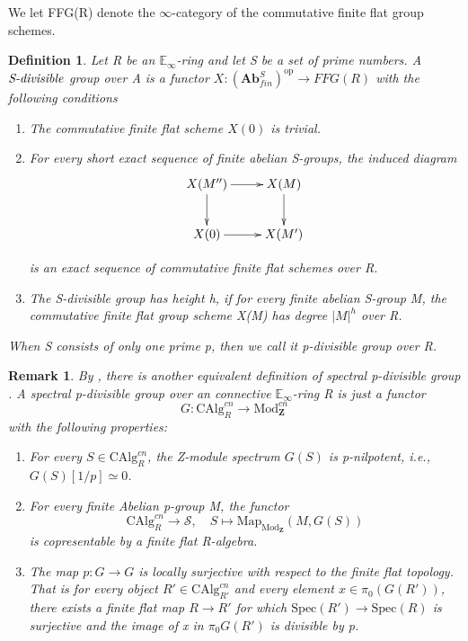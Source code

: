 \documentclass[12pt]{article}
\theoremstyle{thry}
\newtheorem{definition}[theorem]{Definition}
\newtheorem{remark}[theorem]{Remark}
\def  \Ab       {\mathbf{Ab}}
\def  \CAlg     {\mathrm{CAlg}}
\def  \Mod      {\mathrm{Mod}}
\def  \Map      {\mathrm{Map}}
\def  \op       {\mathrm{op}}
\def  \Spec     {\mathrm{Spec}}
\def  \cs       {\mathcal{S}}
\def  \be       {\mathbb{E}}
\def  \bz       {\mathbf{Z}}
\begin{document}
We let FFG(R) denote the $\infty$-category of the commutative finite flat group schemes. 

\begin{definition}
	Let R be an $\be_{\infty}$-ring and let S be a set of prime numbers. A $\emph{S-divisible}$ group over A is a functor $X: (\Ab^S_{fin})^{\op} \to FFG(R) $  with the following conditions
	\begin{enumerate}
		\item  The commutative finite flat scheme $X(0)$ is trivial.
		\item For every short exact sequence of finite abelian S-groups, the induced diagram
		$$
		\xymatrix{
			X(M'')  \ar[r]  \ar[d]  & X(M)  \ar[d]   \\
			X(0)   \ar[r]    &    X(M')               \\
		}
		$$
		
		is an exact sequence of commutative finite flat schemes over R.
		\item The S-divisible group has height h, if for every finite abelian S-group M, the commutative finite flat group scheme X(M) has degree $|M|^h$ over R.
	\end{enumerate}
	When S consists of only one prime p, then we call it p-divisible group over R.
\end{definition}


\begin{remark}
	By \cite[Proposition 6.5.8]{lu-EC1}, there  is another equivalent definition of spectral p-divisible group \cite[Definition 6.0.2]{lu-EC2}. A spectral p-divisible group over an connective $\be_{\infty}$-ring R is just a functor
	$$
	G: \CAlg_R^{cn} \to \Mod_{\bz}^{cn}
	$$
	with the following properties:
	\begin{enumerate}
		\item For every $S \in \CAlg_R^{cn}$, the Z-module spectrum $G(S)$ is p-nilpotent, i.e., $G(S)[1/p] \simeq 0$.
		\item  For every finite Abelian p-group M, the functor
		$$
		\CAlg_R^{cn} \to \cs, \quad S \mapsto  \Map_{\Mod_{\bz}}(M, G(S))
		$$
		is copresentable by a finite flat R-algebra. 
		\item  The map $p: G \to G$ is locally surjective with respect to the finite flat topology. That is for every object $R' \in \CAlg_{R'}^{cn}$ and every element $x \in \pi_0 (G(R'))$, there exists a finite flat map $R \to R'$ for which $\Spec(R') \to \Spec (R)$ is surjective and the image of x in $\pi_0 G(R')$ is divisible by p.
	\end{enumerate}
\end{remark}
\end{document}
